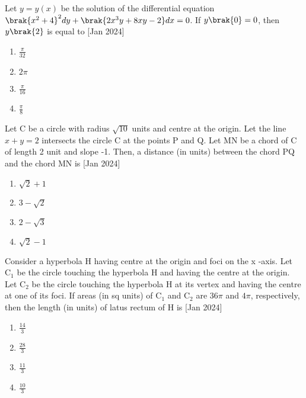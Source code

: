 \item{
        	
        	
        	Let $y=y(x)$ be the solution of the differential equation 
        	$\brak{x^{2}+4}^{2} d y+\brak{2 x^{3} y+8 x y-2} d x=0$. If $y\brak{0}=0$, then $y\brak{2}$ is equal to
        	\hfill
        	{[Jan 2024]}
        	\begin{multicols}{4}
        		\begin{enumerate}
        			\item  $\frac{\pi}{32}$
        			\item  $2\pi$
        			\item  $\frac{\pi}{16}$
        			\item  $\frac{\pi}{8}$
        		\end{enumerate}
        	\end{multicols}
        	
        }
    \item{
     		
     		Let C be a circle with radius $\sqrt{10}$ units and centre at the origin. Let the 
     		line $x+y=2$ intersects the circle C at the points P and Q. Let MN be a chord of C 
     		of length 2 unit and slope -1. Then, a distance (in units) between the chord PQ and the chord MN is \text{ }
            \hfill
            {[Jan 2024]}
            \begin{multicols}{4}
                \begin{enumerate}
                	\item $\sqrt{2}+1$
                	\item $3-\sqrt{2}$
                	\item $2-\sqrt{3}$
                	\item $\sqrt{2}-1$
                \end{enumerate}
            \end{multicols}
        
        }
    \item{
            
            Consider a hyperbola H having centre at the origin and foci on the x -axis. Let $\mathrm{C}_{1}$ be the circle touching the hyperbola H and having the centre at the origin. Let $\mathrm{C}_{2}$ be the circle touching the hyperbola H at its vertex and having the centre at one of its foci. If areas (in sq units) of $\mathrm{C}_{1}$ and $\mathrm{C}_{2}$ are $36 \pi$ and $4 \pi$, respectively, then the length (in units) of latus rectum of H is \text{ }
           	\hfill
                {[Jan 2024]}
            
           \begin{multicols}{4}
            	\begin{enumerate}
            		\item $\frac{14}{3}$
            		\item $\frac{28}{3}$
            		\item $\frac{11}{3}$
            		\item $\frac{10}{3}$
            	\end{enumerate}
            \end{multicols}
        
        }
